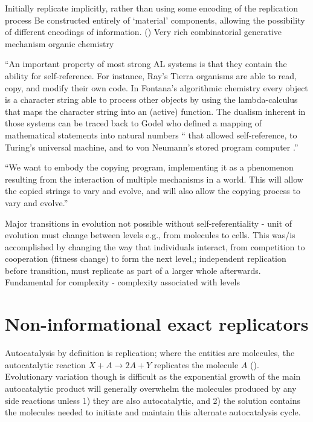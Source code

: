 \begin{DRAFT}
Initially replicate implicitly, rather than using some encoding of the replication process  \parencite{Taylor2001}
Be constructed entirely of `material' components, allowing the possibility of different encodings of information. ()
Very rich combinatorial generative mechanism \eg organic chemistry \parencite{Vasas2015}

``An important property of most strong AL systems is that they contain the ability for self-reference. For instance, Ray's Tierra organisms are able to read, copy, and modify their own code. In Fontana's algorithmic chemistry every object is a character string able to process other objects by using the lambda-calculus that maps the character string into an (active) function. The dualism inherent in those systems can be traced back to Godel who defined a mapping of mathematical statements into natural numbers `` that allowed self-reference, to Turing's universal machine, and to von Neumann's stored program computer .''\parencite{Dittrich1998}

``We want to embody the copying program, implementing it as a phenomenon resulting from the interaction of multiple mechanisms in a world. This will allow the copied strings to vary and evolve, and will also allow the copying process to vary and evolve.'' \textcite{Nellis2014}

Major transitions in evolution not possible without self-referentiality - unit of evolution must change between levels e.g., from molecules to cells. This was/is accomplished by changing the way that individuals interact, from competition to cooperation (fitness change) to form the next level,; independent replication before transition, must replicate as part of a larger whole afterwards. 
Fundamental for complexity - complexity associated with levels  \parencite{Watson2015}
\end{DRAFT}

\section{Non-informational exact replicators}\label{non-informational-exact-replicators}

Autocatalysis by definition is replication; where the entities are molecules, the autocatalytic reaction $X + A\rightarrow 2A + Y$ replicates the molecule $A$ (\eg \textcite{Zachar2010,Lifson1997}). Evolutionary variation though is difficult as the exponential growth of the main autocatalytic product will generally overwhelm the molecules produced by any side reactions unless 1) they are also autocatalytic, and 2) the solution contains the molecules needed to initiate and maintain this alternate autocatalysis cycle.

